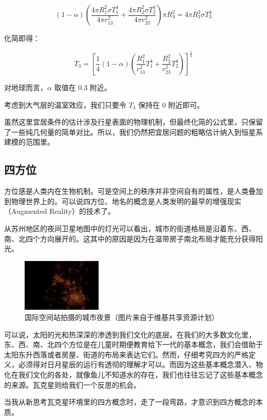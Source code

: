 \documentclass[a4paper,10.5pt]{article}
\begin{document}
$$\left ( 1 - \alpha \right ) \left(  \frac{4 \pi R_1^2 \sigma T_1^4} {4 \pi r_{13}^2} + \frac{4 \pi R_2^2 \sigma T_2^4} {4 \pi r_{23}^2} \right ) \pi R_3^2= 4 \pi R_3^2 \sigma T_3^4$$

化简即得：

$$T_3 = \left[ \frac{1}{4} \left( 1 - \alpha \right ) \left( \frac{R_1^2}{r_{13}^2} T_1^4 + \frac{R_2^2}{r_{23}^2} T_2^4 \right ) \right ]^{\frac{1}{4}}$$

对地球而言，$\alpha$ 取值在 0.3 附近。

考虑到大气层的温室效应，我们只要令 $T_3$ 保持在 0 附近即可。

虽然这里宜居条件的估计涉及行星表面的物理机制，但最终化简的公式里，只保留了一些纯几何量的简单对比。所以，我们仍然把宜居问题的粗略估计纳入到恒星系建模的范围里。

\subsection{四方位}

方位感是人类内在生物机制。可是空间上的秩序并非空间自有的属性，是人类叠加到物理世界上的。可以说四方位、地名的概念是人类发明的最早的增强现实（Augmented Reality）的技术了。

从苏州地区的夜间卫星地图中的灯光可以看出，城市的街道格局是沿着东、西、南、北四个方向展开的。这其中的原因是因为在温带房子南北布局才能充分获得阳光。

\begin{figure}[ht]
\centering
\includegraphics[width=1.5in]{images/4_01-ISS-30_Nighttime_view_of_Shanghai.jpg}
\caption{国际空间站拍摄的城市夜景（图片来自于维基共享资源计划）}
\end{figure}

可以说，太阳的光和热深深的渗透到我们文化的底层。在我们的大多数文化里，东、西、南、北四个方位是在儿童时期便教育给下一代的基本概念，我们会借助于太阳东升西落或者房屋、街道的布局来表达它们。然而，仔细考究四方的严格定义，必须得对日月星辰的运行有透彻的理解才可以。而因为这些基本概念潜入、物化在我们文化的各处，就像鱼儿不知道水的存在，我们也往往忘记了这些基本概念的来源。瓦克星则给我们一个反思的机会。

当我从新思考瓦克星环境里的四方概念时，走了一段弯路，才意识到四方概念的本质。
\end{document}
